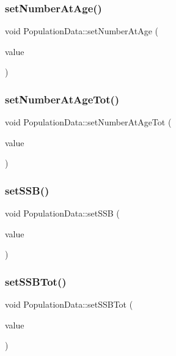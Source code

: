 \subsubsection{\texorpdfstring{setNumberAtAge()}{setNumberAtAge()}}
{\footnotesize\ttfamily void Population\+Data\+::set\+Number\+At\+Age (\begin{DoxyParamCaption}\item[{const Q\+Vector$<$ double $>$ \&}]{value }\end{DoxyParamCaption})}

\mbox{\label{class_population_data_a17e51aae972c1ecb72571556f407597f}} 
\subsubsection{\texorpdfstring{setNumberAtAgeTot()}{setNumberAtAgeTot()}}
{\footnotesize\ttfamily void Population\+Data\+::set\+Number\+At\+Age\+Tot (\begin{DoxyParamCaption}\item[{double}]{value }\end{DoxyParamCaption})}

\mbox{\label{class_population_data_a3d9157cd5a98d7f826fe0490334f657b}} 
\subsubsection{\texorpdfstring{setSSB()}{setSSB()}}
{\footnotesize\ttfamily void Population\+Data\+::set\+S\+SB (\begin{DoxyParamCaption}\item[{const Q\+Vector$<$ double $>$ \&}]{value }\end{DoxyParamCaption})}

\mbox{\label{class_population_data_a3d6e75c351eec005163ffbcfb1c17cbb}} 
\subsubsection{\texorpdfstring{setSSBTot()}{setSSBTot()}}
{\footnotesize\ttfamily void Population\+Data\+::set\+S\+S\+B\+Tot (\begin{DoxyParamCaption}\item[{double}]{value }\end{DoxyParamCaption})}

